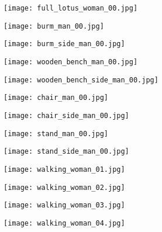 
\texttt{[image: full\_lotus\_woman\_00.jpg]}

\texttt{[image: burm\_man\_00.jpg]}

\texttt{[image: burm\_side\_man\_00.jpg]}

\texttt{[image: wooden\_bench\_man\_00.jpg]}

\texttt{[image: wooden\_bench\_side\_man\_00.jpg]}

\texttt{[image: chair\_man\_00.jpg]}

\texttt{[image: chair\_side\_man\_00.jpg]}

\texttt{[image: stand\_man\_00.jpg]}

\texttt{[image: stand\_side\_man\_00.jpg]}

\texttt{[image: walking\_woman\_01.jpg]}

\texttt{[image: walking\_woman\_02.jpg]}

\texttt{[image: walking\_woman\_03.jpg]}

\texttt{[image: walking\_woman\_04.jpg]}


